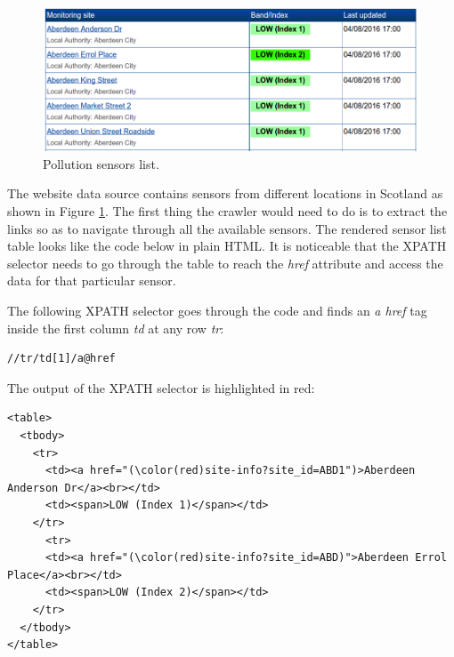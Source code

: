 \begin{figure}[H]
\begin{adjustbox}{width=.5\textwidth,center=\textwidth}
  \centering
  \includegraphics[scale=1]{images/monitoring_summary.png}
\end{adjustbox}
  \caption[Pollution sensors list]{Pollution sensors list.\footnotemark}
  \label{fig:pollution_sensors_list}
\end{figure}

The website data source contains sensors from different locations in Scotland as shown in Figure \ref{fig:pollution_sensors_list}. The first thing the crawler would need to do is to extract the links so as to navigate through all the available sensors. The rendered sensor list table looks like the code below in plain HTML. It is noticeable that the XPATH selector needs to go through the table to reach the \textit{href} attribute and access the data for that particular sensor.


The following XPATH selector goes through the code and finds an \textit{a href} tag inside the first column \textit{td} at any row \textit{tr}:
\bigskip

{\centering
\begin{BVerbatim}
//tr/td[1]/a@href
\end{BVerbatim}
\par
}\bigskip

The output of the XPATH selector is highlighted in red: 

\begin{Verbatim}[fontsize=\small,commandchars=\\\(\)]
<table>
  <tbody>
    <tr>
      <td><a href="(\color(red)site-info?site_id=ABD1")>Aberdeen Anderson Dr</a><br></td>
      <td><span>LOW (Index 1)</span></td>
    </tr>
      <tr>
      <td><a href="(\color(red)site-info?site_id=ABD)">Aberdeen Errol Place</a><br></td>
      <td><span>LOW (Index 2)</span></td>
    </tr>
  </tbody>
</table>
\end{Verbatim}

